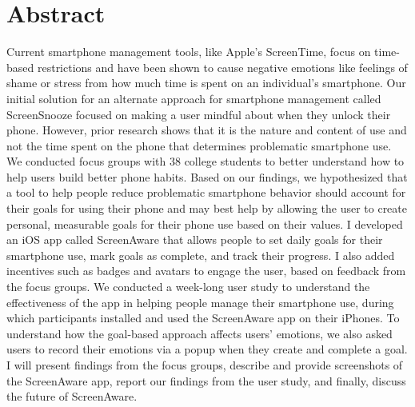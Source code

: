 \documentclass[12pt, title page, manuscript, nonacm]{acmart}
\begin{document}
\section*{Abstract}
Current smartphone management tools, like Apple’s ScreenTime, focus on time-based restrictions and have been shown to cause negative emotions like feelings of shame or stress from how much time is spent on an individual’s smartphone. Our initial solution for an alternate approach for smartphone management called ScreenSnooze focused on making a user mindful about when they unlock their phone. However, prior research shows that it is the nature and content of use and not the time spent on the phone that determines problematic smartphone use. We conducted focus groups with 38 college students to better understand how to help users build better phone habits. Based on our findings, we hypothesized that a tool to help people reduce problematic smartphone behavior should account for their goals for using their phone and may best help by allowing the user to create personal, measurable goals for their phone use based on their values. I developed an iOS app called ScreenAware that allows people to set daily goals for their smartphone use, mark goals as complete, and track their progress. I also added incentives such as badges and avatars to engage the user, based on feedback from the focus groups. We conducted a week-long user study to understand the effectiveness of the app in helping people manage their smartphone use, during which participants installed and used the ScreenAware app on their iPhones. To understand how the goal-based approach affects users' emotions, we also asked users to record their emotions via a popup when they create and complete a goal. I will present findings from the focus groups, describe and provide screenshots of the ScreenAware app, report our findings from the user study, and finally, discuss the future of ScreenAware.
\newpage
\end{document}
